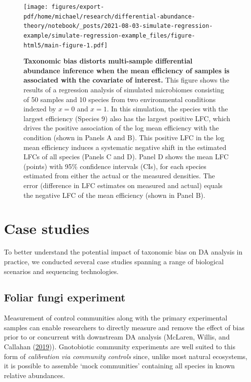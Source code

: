 \documentclass[
]{article}
\begin{document}
\begin{figure}
\centering
\texttt{[image: figures/export-pdf/home/michael/research/differential-abundance-theory/notebook/\_posts/2021-08-03-simulate-regression-example/simulate-regression-example\_files/figure-html5/main-figure-1.pdf]}
\caption{\label{fig:regression-example}\textbf{Taxonomic bias distorts multi-sample differential abundance inference when the mean efficiency of samples is associated with the covariate of interest.} This figure shows the results of a regression analysis of simulated microbiomes consisting of 50 samples and 10 species from two environmental conditions indexed by \(x=0\) and \(x=1\). In this simulation, the species with the largest efficiency (Species 9) also has the largest positive LFC, which drives the positive association of the log mean efficiency with the condition (shown in Panels A and B). This positive LFC in the log mean efficiency induces a systematic negative shift in the estimated LFCs of all species (Panels C and D). Panel D shows the mean LFC (points) with 95\% confidence intervals (CIs), for each species estimated from either the actual or the measured densities. The error (difference in LFC estimates on measured and actual) equals the negative LFC of the mean efficiency (shown in Panel B).}
\end{figure}



\hypertarget{case-studies}{%
\section{Case studies ~}\label{case-studies}}

To better understand the potential impact of taxonomic bias on DA analysis in practice, we conducted several case studies spanning a range of biological scenarios and sequencing technologies.

\hypertarget{foliar-fungi-experiment}{%
\subsection{Foliar fungi experiment}\label{foliar-fungi-experiment}}

Measurement of control communities along with the primary experimental samples can enable researchers to directly measure and remove the effect of bias prior to or concurrent with downstream DA analysis (McLaren, Willis, and Callahan (\protect\hyperlink{ref-mclaren2019cons}{2019})).
Gnotobiotic community experiments are well suited to this form of \emph{calibration via community controls} since, unlike most natural ecosystems, it is possible to assemble `mock communities' containing all species in known relative abundances.
\end{document}
